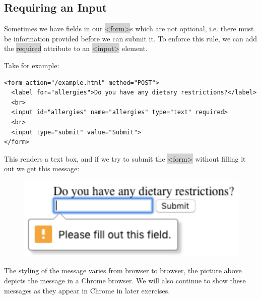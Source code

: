 \documentclass[11pt]{article}
\begin{document}
\subsection{Requiring an Input}
Sometimes we have fields in our \colorbox{lightgray}{<form>}s which are not optional, i.e. there must be information provided before we can submit it. To enforce this rule, we can add the \colorbox{lightgray}{required} attribute to an \colorbox{lightgray}{<input>} element.

Take for example:
\begin{lstlisting}
<form action="/example.html" method="POST">
  <label for="allergies">Do you have any dietary restrictions?</label>
  <br>
  <input id="allergies" name="allergies" type="text" required>
  <br>
  <input type="submit" value="Submit">
</form>
\end{lstlisting}
This renders a text box, and if we try to submit the \colorbox{lightgray}{<form>} without filling it out we get this message:
\begin{figure}[H]
\includegraphics[scale = 0.7]{5_1}
\centering 
\end{figure}
\vspace{-4mm}

The styling of the message varies from browser to browser, the picture above depicts the message in a Chrome browser. We will also continue to show these messages as they appear in Chrome in later exercises.
\end{document}
